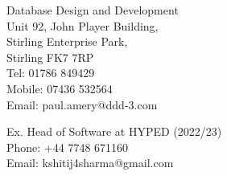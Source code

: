 \documentclass[]{hieudo-build}
\begin{document}
\begin{multicols*}{2}

Database Design and Development \\
\minisectionsep
Unit 92, John Player Building, \\
Stirling Enterprise Park, \\
Stirling FK7 7RP \\
\minisectionsep
Tel: 01786 849429 \\
Mobile: 07436 532564 \\
Email: paul.amery@ddd-3.com \\

\vfill\null
\columnbreak

Ex. Head of Software at HYPED (2022/23) \\
\minisectionsep
Phone: +44 7748 671160 \\
Email: kshitij4sharma@gmail.com\\

\end{multicols*}
\end{document}
